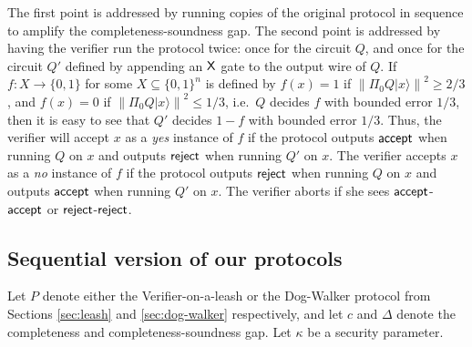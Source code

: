 \documentclass[11pt,letter]{article}
\theoremstyle{remark}
\theoremstyle{definition}
\newcommand{\ket}[1]{|#1\rangle}
\newcommand{\norm}[1]{\left\|#1\right\|}
\begin{document}
The first point is addressed by running copies of the original protocol in sequence to amplify the completeness-soundness gap. The second point is addressed by having the verifier run the protocol twice: once for the circuit $Q$, and once for the circuit $Q'$ defined by appending an $\sf X$ gate to the output wire of $Q$. If $f:X\rightarrow \{0,1\}$ for some $X\subseteq \{0,1\}^n$ is defined by $f(x)=1$ if $\norm{\Pi_0 Q\ket{x}}^2\geq 2/3$, and $f(x)=0$ if $\norm{\Pi_0 Q\ket{x}}^2\leq 1/3$, i.e.\ $Q$ decides $f$ with bounded error $1/3$, then it is easy to see that $Q'$ decides $1-f$ with bounded error $1/3$. Thus, the verifier will accept $x$ as a \textit{yes} instance of $f$ if the protocol outputs ${\sf accept}$ when running $Q$ on $x$ and outputs $\sf reject$ when running $Q'$ on $x$. The verifier accepts $x$ as a \textit{no} instance of $f$ if the protocol outputs $\sf reject$ when running $Q$ on $x$ and outputs $\sf accept$ when running $Q'$ on $x$. The verifier aborts if she sees $\sf accept$-$\sf accept$ or $\sf reject$-$\sf reject$. 



\subsection{Sequential version of our protocols}

Let $P$ denote either the Verifier-on-a-leash or the Dog-Walker protocol from Sections \ref{sec:leash} and \ref{sec:dog-walker} respectively, and let $c$ and $\Delta$ denote the completeness and completeness-soundness gap. Let $\kappa$ be a security parameter.
\end{document}
